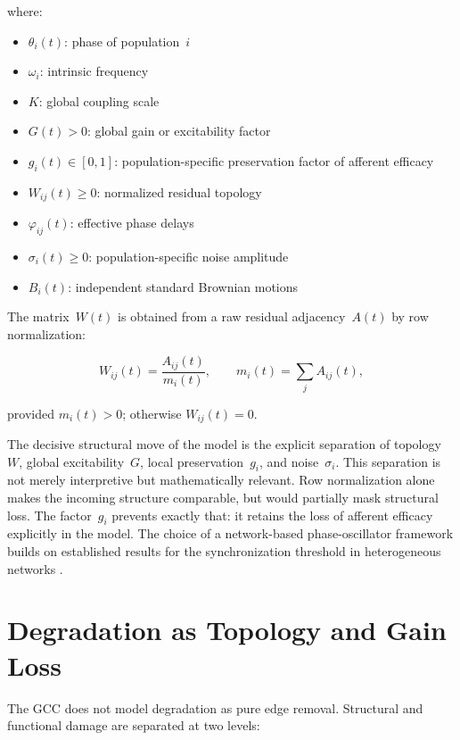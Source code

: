\documentclass[11pt,a4paper]{article}
\theoremstyle{plain}
\theoremstyle{definition}
\theoremstyle{remark}
\begin{document}
where:
\begin{itemize}
  \item $\theta_i(t)$: phase of population~$i$
  \item $\omega_i$: intrinsic frequency
  \item $K$: global coupling scale
  \item $G(t) > 0$: global gain or excitability factor
  \item $g_i(t) \in [0,1]$: population-specific preservation factor of afferent efficacy
  \item $W_{ij}(t) \geq 0$: normalized residual topology
  \item $\varphi_{ij}(t)$: effective phase delays
  \item $\sigma_i(t) \geq 0$: population-specific noise amplitude
  \item $B_i(t)$: independent standard Brownian motions
\end{itemize}

The matrix~$W(t)$ is obtained from a raw residual adjacency~$A(t)$ by row normalization:

\begin{equation}
\label{eq:normierung}
W_{ij}(t) = \frac{A_{ij}(t)}{m_i(t)}, \qquad m_i(t) = \sum_j A_{ij}(t),
\end{equation}

provided $m_i(t) > 0$; otherwise $W_{ij}(t) = 0$.

The decisive structural move of the model is the explicit separation of topology~$W$, global excitability~$G$, local preservation~$g_i$, and noise~$\sigma_i$. This separation is not merely interpretive but mathematically relevant. Row normalization alone makes the incoming structure comparable, but would partially mask structural loss. The factor~$g_i$ prevents exactly that: it retains the loss of afferent efficacy explicitly in the model. The choice of a network-based phase-oscillator framework builds on established results for the synchronization threshold in heterogeneous networks \citep{restrepo2005,arenas2008}.


\section{Degradation as Topology and Gain Loss}
\label{sec:abbau}
\label{sec:degradation}

The GCC does not model degradation as pure edge removal. Structural and functional damage are separated at two levels:
\end{document}
